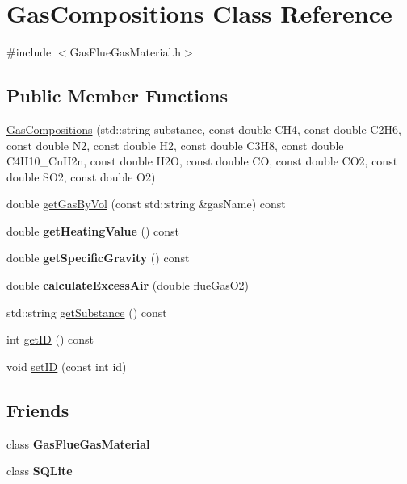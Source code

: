 \hypertarget{class_gas_compositions}{}\section{Gas\+Compositions Class Reference}
\label{class_gas_compositions}


{\ttfamily \#include $<$Gas\+Flue\+Gas\+Material.\+h$>$}

\subsection*{Public Member Functions}
\begin{DoxyCompactItemize}
\item 
\hyperlink{class_gas_compositions_ad0021d4285883374f8904f9465e41920}{Gas\+Compositions} (std\+::string substance, const double C\+H4, const double C2\+H6, const double N2, const double H2, const double C3\+H8, const double C4\+H10\+\_\+\+Cn\+H2n, const double H2O, const double CO, const double C\+O2, const double S\+O2, const double O2)
\item 
double \hyperlink{class_gas_compositions_a2028a42c136e057a6153b7bfa68d63e6}{get\+Gas\+By\+Vol} (const std\+::string \&gas\+Name) const
\item 
\mbox{\label{class_gas_compositions_a7ebcdf1c991bd70f28eb845e45d62afd}} 
double {\bfseries get\+Heating\+Value} () const
\item 
\mbox{\label{class_gas_compositions_a4f891acb4f8dc3992703155c6ba7ccb0}} 
double {\bfseries get\+Specific\+Gravity} () const
\item 
\mbox{\label{class_gas_compositions_a4f6408254477960648440da460099e2d}} 
double {\bfseries calculate\+Excess\+Air} (double flue\+Gas\+O2)
\item 
std\+::string \hyperlink{class_gas_compositions_abad9554bca9b68cd970eae11bdd3c505}{get\+Substance} () const
\item 
int \hyperlink{class_gas_compositions_a9668decdb2b5065c8ee3c59c207b9d51}{get\+ID} () const
\item 
void \hyperlink{class_gas_compositions_a9fc3ebfcbda7134b67ed76a39b4c94cc}{set\+ID} (const int id)
\end{DoxyCompactItemize}
\subsection*{Friends}
\begin{DoxyCompactItemize}
\item 
\mbox{\label{class_gas_compositions_a766940ed13969e69611945f2d080c881}} 
class {\bfseries Gas\+Flue\+Gas\+Material}
\item 
\mbox{\label{class_gas_compositions_ac7d22f3ca36435f73d55df60dc799e14}} 
class {\bfseries S\+Q\+Lite}
\end{DoxyCompactItemize}


